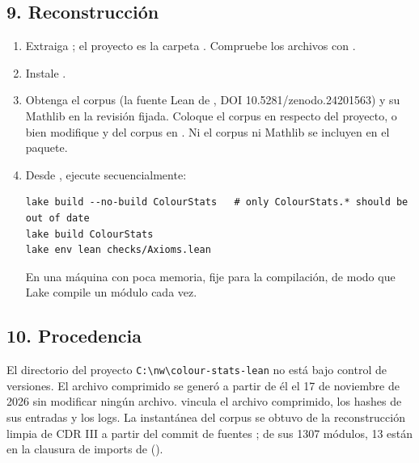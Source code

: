 \documentclass[spanish,11pt,a4paper]{article}
\begin{document}
\subsection{9. Reconstrucción}\label{reconstrucciuxf3n}

\begin{enumerate}
\def\labelenumi{\arabic{enumi}.}
\item
  Extraiga ; el proyecto es la carpeta . Compruebe los archivos con .
\item
  Instale .
\item
  Obtenga el corpus (la fuente Lean de , DOI 10.5281/zenodo.24201563) y su Mathlib en la revisión fijada. Coloque el corpus en  respecto del proyecto, o bien modifique  y  del corpus en . Ni el corpus ni Mathlib se incluyen en el paquete.
\item
  Desde , ejecute secuencialmente:

\begin{verbatim}
lake build --no-build ColourStats   # only ColourStats.* should be out of date
lake build ColourStats
lake env lean checks/Axioms.lean
\end{verbatim}

  En una máquina con poca memoria, fije  para la compilación, de modo que Lake compile un módulo cada vez.
\end{enumerate}

\subsection{10. Procedencia}\label{procedencia}

El directorio del proyecto \texttt{C:\textbackslash{}nw\textbackslash{}colour-stats-lean} no está bajo control de versiones. El archivo comprimido se generó a partir de él el 17 de noviembre de 2026 sin modificar ningún archivo.  vincula el archivo comprimido, los hashes de sus entradas y los logs. La instantánea del corpus se obtuvo de la reconstrucción limpia de CDR III a partir del commit de fuentes ; de sus 1307 módulos, 13 están en la clausura de imports de  ().
\end{document}
